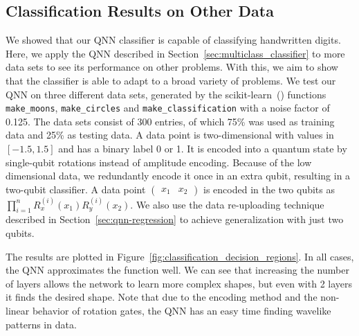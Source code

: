 \documentclass[a4paper,10pt]{article}
\begin{document}
\begin{appendices}
\section{Classification Results on Other Data} \label{sec:classification-other}
We showed that our QNN classifier is capable of classifying handwritten digits.
Here, we apply the QNN described in Section~\ref{sec:multiclass_classifier} to more data sets to see its performance on other problems.
With this, we aim to show that the classifier is able to adapt to a broad variety of problems.
We test our QNN on three different data sets, generated by the scikit-learn~(\cite{scikit-learn}) functions \verb|make_moons|, \verb|make_circles| and \verb|make_classification| with a noise factor of 0.125.
The data sets consist of 300 entries, of which 75\% was used as training data and 25\% as testing data.
A data point is two-dimensional with values in $[-1.5, 1.5]$ and has a binary label 0 or 1.
It is encoded into a quantum state by single-qubit rotations instead of amplitude encoding.
Because of the low dimensional data, we redundantly encode it once in an extra qubit, resulting in a two-qubit classifier.
A data point $(\begin{matrix}x_1 & x_2\end{matrix})$ is encoded in the two qubits as $\prod_{i=1}^{n}R_x^{(i)}(x_1)R_y^{(i)}(x_2)$.
We also use the data re-uploading technique described in Section~\ref{sec:qnn-regression} to achieve generalization with just two qubits.

The results are plotted in Figure~\ref{fig:classification_decision_regions}.
In all cases, the QNN approximates the function well.
We can see that increasing the number of layers allows the network to learn more complex shapes, but even with 2 layers it finds the desired shape.
Note that due to the encoding method and the non-linear behavior of rotation gates, the QNN has an easy time finding wavelike patterns in data.


\end{appendices}
\end{document}
